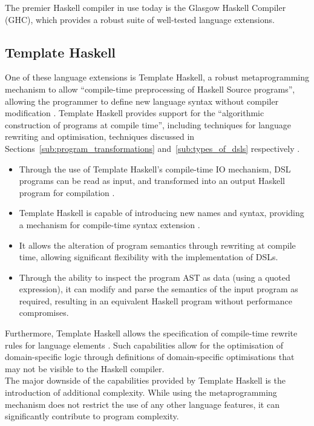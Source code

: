The premier Haskell compiler in use today is the Glasgow Haskell Compiler (GHC), which provides a robust suite of well-tested language extensions.

\subsection{Template Haskell} %
\label{sub:template_haskell}
One of these language extensions is Template Haskell, a robust metaprogramming mechanism to allow ``compile-time preprocessing of Haskell Source programs'', allowing the programmer to define new language syntax without compiler modification \citep{Sheard:2002:TMH:581690.581691,Czarnecki2004}.
Template Haskell provides support for the ``algorithmic construction of programs at compile time'', including techniques for language rewriting and optimisation, techniques discussed in Sections~\ref{sub:program_transformations} and~\ref{sub:types_of_dsls} respectively \citep{Sheard:2002:TMH:581690.581691,jones2001playing}.
\begin{itemize}
    \item Through the use of Template Haskell's compile-time IO mechanism, DSL programs can be read as input, and transformed into an output Haskell program for compilation \citep[pg. 9]{Czarnecki2004}.
    \item Template Haskell is capable of introducing new names and syntax, providing a mechanism for compile-time syntax extension \citep{Czarnecki2004}.
    \item It allows the alteration of program semantics through rewriting at compile time, allowing significant flexibility with the implementation of DSLs. 
    \item Through the ability to inspect the program AST as data (using a quoted expression), it can modify and parse the semantics of the input program as required, resulting in an equivalent Haskell program without performance compromises.
\end{itemize}

Furthermore, Template Haskell allows the specification of compile-time rewrite rules for language elements \citep{jones2001playing}.
Such capabilities allow for the optimisation of domain-specific logic through definitions of domain-specific optimisations that may not be visible to the Haskell compiler. \\

The major downside of the capabilities provided by Template Haskell is the introduction of additional complexity. 
While using the metaprogramming mechanism does not restrict the use of any other language features, it can significantly contribute to program complexity.

